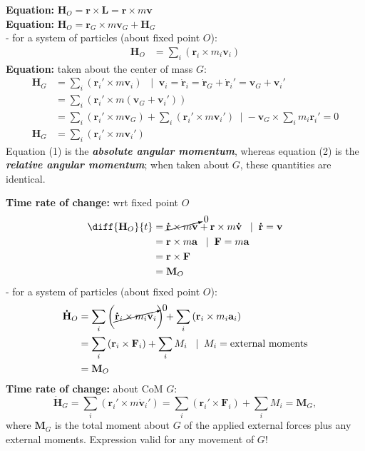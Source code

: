 \documentclass[10pt,landscape]{article}
\begin{document}
\begin{multicols}{3}
    {\bf Equation:} $\mathbf{H}_{O} = \mathbf{r} \times \mathbf{L} = \mathbf{r} 
    \times m\mathbf{v}$ \\
    {\bf Equation:} $\mathbf{H}_{O} = \mathbf{r}_G \times m\mathbf{v}_G + \mathbf{H}_G$ \\
    - for a system of particles (about fixed point $O$):
    \begin{align*}
        \mathbf{H}_O &= \sum_i \left( \mathbf{r}_i \times m_i \mathbf{v}_i \right)
    \end{align*}
    {\bf Equation:} taken about the center of mass $G$:
    \begin{align}
        \mathbf{H}_G &= \sum_i \left( \mathbf{r}_i' \times m \mathbf{v}_i \right) \;\;\; | \;\; \mathbf{v}_i = 
            \mathbf{\dot{r}}_i = \mathbf{\dot{r}}_G + \mathbf{\dot{r}}_i' = \mathbf{v}_G + \mathbf{v}_i' \\
        &= \sum_i \left( \mathbf{r}_i' \times m \left( \mathbf{v}_G + \mathbf{v}_i' \right) \right) \nonumber\\
        &= \sum_i \left( \mathbf{r}_i' \times m \mathbf{v}_G \right) + 
           \sum_i \left( \mathbf{r}_i' \times m \mathbf{v}_i' \right)\;\; | 
           \; -\mathbf{v}_G \times \sum_i m_i \mathbf{r}_i' = 0  \nonumber\\
        \mathbf{H}_G &= \sum_i \left( \mathbf{r}_i' \times m \mathbf{v}_i' \right)
    \end{align}
    Equation (1) is the {\bf \em absolute angular momentum}, whereas
    equation (2) is the {\bf \em relative angular momentum}; when taken about 
    $G$, these quantities are identical.

    {\bf Time rate of change:} wrt fixed point $O$
    \begin{align*}
        \diff{\mathbf{H}_O}{t} &= \cancelto{0}{\mathbf{\dot{r}} \times m\mathbf{v}} + 
        \mathbf{r} \times m\mathbf{\dot{v}}\;\;\; | \;\; \mathbf{\dot{r}} = \mathbf{v}    \\
        &= \mathbf{r} \times m\mathbf{a}\;\;\; | \;\; \mathbf{F} = m\mathbf{a}    \\
        &= \mathbf{r} \times \mathbf{F} \\
        &= \mathbf{M}_O
    \end{align*}
    - for a system of particles (about fixed point $O$):
    \begin{align*}
        \mathbf{\dot{H}}_O &= \sum_i \left( \cancelto{0}{\mathbf{\dot{r}}_i \times m_i \mathbf{v}_i} \right) + 
            \sum_i \left( \mathbf{{r}}_i \times m_i \mathbf{a}_i \right) \\
        &= \sum_i \left( \mathbf{{r}}_i \times \mathbf{F}_i \right) + \sum_i M_i \;\;\; | \;\; M_i 
            = \text{external moments} \\
        &= \mathbf{M}_O
    \end{align*}
    {\bf Time rate of change:} about CoM $G$:
    \[\mathbf{\dot{H}}_G = \sum_i \left( \mathbf{r}_i' \times m \mathbf{\dot{v}}_i' \right) = 
        \sum_i \left( \mathbf{r}_i' \times \mathbf{F}_i \right) + \sum_i M_i = \mathbf{M}_G,\]
    where $\mathbf{M}_G$ is the total moment about $G$ of the applied external
    forces plus any external moments. Expression valid for any movement of $G$!



\end{multicols}
\end{document}

